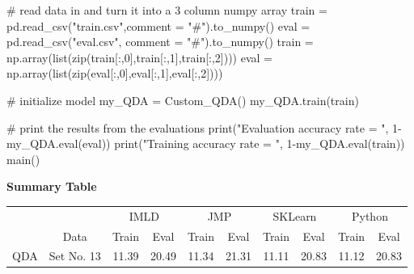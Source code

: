\documentclass{article}
\begin{document}
\begin{flushleft}
\begin{python}
        # read data in and turn it into a 3 column numpy array
        train = pd.read_csv("train.csv",comment = "#").to_numpy()
        eval = pd.read_csv("eval.csv", comment = "#").to_numpy()
        train = np.array(list(zip(train[:,0],train[:,1],train[:,2])))
        eval = np.array(list(zip(eval[:,0],eval[:,1],eval[:,2])))

        # initialize model
        my_QDA = Custom_QDA()
        my_QDA.train(train)
        
        # print the results from the evaluations
        print("Evaluation accuracy rate = ", 1-my_QDA.eval(eval))
        print("Training accuracy rate = ", 1-my_QDA.eval(train))
main()
\end{python}
\textbf{Summary Table}\break
\break
\end{flushleft}
\centering
\begin{tabular}{|c| c| c| c| c| c| c| c| c| c|}
\hline
\rowcolor{gray!20}
 &  & \multicolumn{2}{|c|}{IMLD} & \multicolumn{2}{|c|}{JMP} & \multicolumn{2}{|c|}{SKLearn} & \multicolumn{2}{|c|}{Python}\\\cline{3-10}
\rowcolor{gray!20}
\multirow{-2}{*}{Algorithm}&\multirow{-2}{*}{Data}& \multicolumn{1}{|c|}{Train} & \multicolumn{1}{|c|}{Eval} & \multicolumn{1}{|c|}{Train} & \multicolumn{1}{|c|}{Eval}& \multicolumn{1}{|c|}{Train} & \multicolumn{1}{|c|}{Eval}& \multicolumn{1}{|c|}{Train} & \multicolumn{1}{|c|}{Eval}\\
\hline
QDA & Set No. 13 & 11.39 & 20.49 & 11.34 & 21.31 & 11.11 & 20.83 & 11.12 & 20.83\\
\hline 
\end{tabular}
\end{document}
